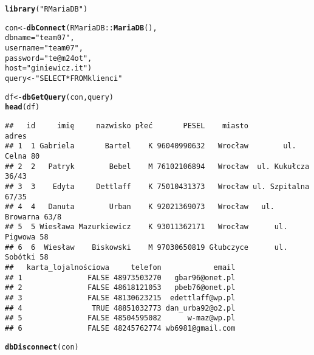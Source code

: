 \documentclass{article}\usepackage[]{graphicx}\usepackage[]{xcolor}
\makeatletter
\newcommand{\hlstr}[1]{\textcolor[rgb]{0.192,0.494,0.8}{#1}}%
\newcommand{\hlopt}[1]{\textcolor[rgb]{0,0,0}{#1}}%
\newcommand{\hlstd}[1]{\textcolor[rgb]{0.345,0.345,0.345}{#1}}%
\newcommand{\hlkwb}[1]{\textcolor[rgb]{0.69,0.353,0.396}{#1}}%
\newcommand{\hlkwc}[1]{\textcolor[rgb]{0.333,0.667,0.333}{#1}}%
\newcommand{\hlkwd}[1]{\textcolor[rgb]{0.737,0.353,0.396}{\textbf{#1}}}%
\newenvironment{kframe}{%
 \def\at@end@of@kframe{}%
 \ifinner\ifhmode%
  \def\at@end@of@kframe{\end{minipage}}%
  \begin{minipage}{\columnwidth}%
 \fi\fi%
 \def\FrameCommand##1{\hskip\@totalleftmargin \hskip-\fboxsep
 \colorbox{shadecolor}{##1}\hskip-\fboxsep
     \hskip-\linewidth \hskip-\@totalleftmargin \hskip\columnwidth}%
 \MakeFramed {\advance\hsize-\width
   \@totalleftmargin\z@ \linewidth\hsize
   \@setminipage}}%
 {\par\unskip\endMakeFramed%
 \at@end@of@kframe}
\newenvironment{knitrout}{}{} %
\makeatother
\begin{document}
\begin{knitrout}
\color{fgcolor}\begin{kframe}
\begin{alltt}
\hlkwd{library}\hlstd{(}\hlstr{"RMariaDB"}\hlstd{)}

\hlstd{con} \hlkwb{<-} \hlkwd{dbConnect}\hlstd{(RMariaDB}\hlopt{::}\hlkwd{MariaDB}\hlstd{(),}
                 \hlkwc{dbname} \hlstd{=} \hlstr{"team07"}\hlstd{,}
                 \hlkwc{username} \hlstd{=} \hlstr{"team07"}\hlstd{,}
                 \hlkwc{password} \hlstd{=} \hlstr{"te@m24ot"}\hlstd{,}
                 \hlkwc{host} \hlstd{=} \hlstr{"giniewicz.it"}\hlstd{)}
\hlstd{query} \hlkwb{<-} \hlstr{"SELECT * FROM klienci"}

\hlstd{df} \hlkwb{<-} \hlkwd{dbGetQuery}\hlstd{(con, query)}
\hlkwd{head}\hlstd{(df)}
\end{alltt}
\begin{verbatim}
##   id     imię     nazwisko płeć       PESEL    miasto               adres
## 1  1 Gabriela       Bartel    K 96040990632   Wrocław        ul. Celna 80
## 2  2   Patryk        Bebel    M 76102106894   Wrocław  ul. Kukułcza 36/43
## 3  3    Edyta     Dettlaff    K 75010431373   Wrocław ul. Szpitalna 67/35
## 4  4   Danuta        Urban    K 92021369073   Wrocław   ul. Browarna 63/8
## 5  5 Wiesława Mazurkiewicz    K 93011362171   Wrocław      ul. Pigwowa 58
## 6  6  Wiesław    Biskowski    M 97030650819 Głubczyce      ul. Sobótki 58
##   karta_lojalnościowa     telefon            email
## 1               FALSE 48973503270   gbar96@onet.pl
## 2               FALSE 48618121053   pbeb76@onet.pl
## 3               FALSE 48130623215  edettlaff@wp.pl
## 4                TRUE 48851032773 dan_urba92@o2.pl
## 5               FALSE 48504595082      w-maz@wp.pl
## 6               FALSE 48245762774 wb6981@gmail.com
\end{verbatim}
\end{kframe}
\end{knitrout}

\begin{knitrout}
\color{fgcolor}\begin{kframe}
\begin{alltt}
\hlkwd{dbDisconnect}\hlstd{(con)}
\end{alltt}
\end{kframe}
\end{knitrout}
\end{document}
